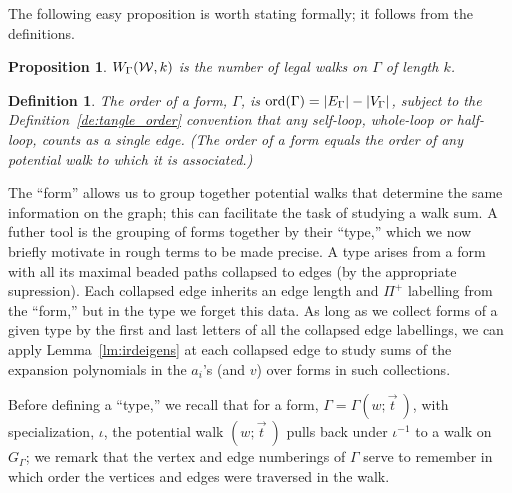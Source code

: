 \documentclass[12pt]{article}
\newtheorem{proposition}[theorem]{Proposition}
\newtheorem{definition}[theorem]{Definition}
\newcommand{\ord}{{\rm ord}}
\newcommand{\from}{\colon}
\newcommand{\cw}{{\cal W}}
\newcommand{\proof}{{\par\noindent {\bf Proof}\space\space}}
\newcommand{\proofbox}{\begin{flushright}$\Box$\end{flushright}}
\begin{document}
The following easy proposition is worth stating formally; it follows
from the definitions.
\begin{proposition} $W_\Gamma(\cw,k)$ is the number of legal walks on
$\Gamma$ of length $k$.
\end{proposition}

\begin{definition} The {\em order} of a form, $\Gamma$, is $\ord(\Gamma)
=|E_\Gamma|-
|V_\Gamma|$, subject to the Definition~\ref{de:tangle_order} convention
that any self-loop, whole-loop or half-loop, counts as a single
edge.  (The order of a form
equals the order of any potential walk to which it is
associated.)
\end{definition}

The ``form'' allows us to group together potential walks that determine
the same information on the graph; this can facilitate the task of studying
a walk sum.  A futher tool is the grouping of forms together by their
``type,'' which we now briefly motivate in rough terms to be made precise.
A type arises from a form with all its maximal
beaded paths collapsed to edges (by the appropriate supression).
Each collapsed edge inherits an edge length and $\Pi^+$ labelling from
the ``form,'' but in the type we forget this data.  As long as we collect
forms of a given type by
the first and last letters of all the collapsed edge labellings, we can
apply Lemma~\ref{lm:irdeigens} at each collapsed edge to study sums 
of the expansion polynomials in the $a_i$'s (and $v$)
over forms in such collections.

Before defining a ``type,''
we recall that for a form, $\Gamma=\Gamma(w;\vec t\>)$,
with specialization, $\iota$, the potential walk $(w;\vec t\>)$ pulls
back under $\iota^{-1}$ to a walk on $G_\Gamma$;
we remark that the vertex and edge numberings
of $\Gamma$
serve to remember in which order the vertices and edges were traversed
in the walk.
\end{document}
